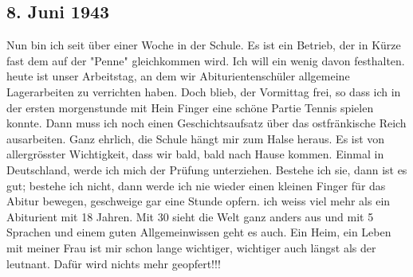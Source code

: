 \subsection{8. Juni 1943}

Nun bin ich seit \"{u}ber einer Woche in der Schule.
Es ist ein Betrieb, der in K\"{u}rze fast dem auf der "Penne" gleichkommen wird.
Ich will ein wenig davon festhalten.
heute ist unser Arbeitstag, an dem wir Abiturientensch\"{u}ler allgemeine Lagerarbeiten zu verrichten haben.
Doch blieb, der Vormittag frei, so dass ich in der ersten morgenstunde mit Hein Finger eine sch\"{o}ne Partie Tennis spielen konnte.
Dann muss ich noch einen Geschichtsaufsatz \"{u}ber das ostfr\"{a}nkische Reich ausarbeiten.
Ganz ehrlich, die Schule h\"{a}ngt mir zum Halse heraus.
Es ist von allergr\"{o}sster Wichtigkeit, dass wir bald, bald nach Hause kommen.
Einmal in Deutschland, werde ich mich der Pr\"{u}fung unterziehen.
Bestehe ich sie, dann ist es gut; bestehe ich nicht, dann werde ich nie wieder einen kleinen Finger f\"{u}r das Abitur bewegen, geschweige gar eine Stunde opfern.
ich weiss viel mehr als ein Abiturient mit 18 Jahren.
Mit 30 sieht die Welt ganz anders aus und mit 5 Sprachen und einem guten Allgemeinwissen geht es auch.
Ein Heim, ein Leben mit meiner Frau ist mir schon lange wichtiger, wichtiger auch l\"{a}ngst als der leutnant.
Daf\"{u}r wird nichts mehr geopfert!!!

\clearpage
